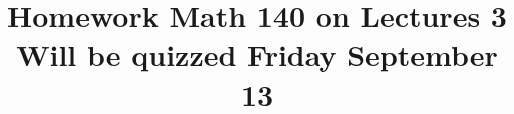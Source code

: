 \documentclass{article}
\date{}
\newcommand{\bigFatWarning}{ %
}
\newtheorem{problem}{Problem}
\newcommand{\homeworkEnd}{\end{document}}
\newcommand{\homeworkStart}[1]{\title{#1}
\begin{document}
\maketitle\bigFatWarning}

\begin{comment}




\homeworkStart{Homework Math 140 on Lectures 3 \\Will be quizzed Friday September 13}



\homeworkEnd

\end{comment}
\homeworkStart{Special homework}

\homeworkEnd


\end{document}
